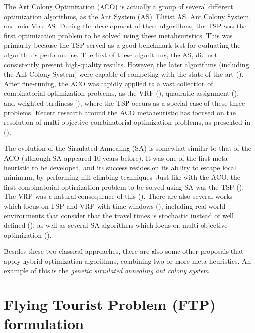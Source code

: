 \documentclass[onecolumn]{elsarticle}
\begin{document}
The Ant Colony Optimization (ACO) is actually a group of several different optimization algorithms, as the Ant System (AS), Elitist AS, Ant Colony System, and min-Max AS. During the development of these algorithms, the TSP was the first optimization problem to be solved using these metaheuristics. This was primarily because the TSP served as a good benchmark test for evaluating the algorithm's performance. The first of these algorithms, the AS, did not consistently present high-quality results. However, the later algorithms (including the Ant Colony System) were capable of competing with the state-of-the-art (\cite{aco_tsp}). After fine-tuning, the ACO was rapidly applied to a vast collection of combinatorial optimization problems, as the VRP (\cite{aco_vrp}), quadratic assignment (\cite{aco_qa}), and weighted tardiness (\cite{aco_wt}), where the TSP occurs as a special case of these three problems. Recent research around the ACO metaheuristic has focused on the resolution of multi-objective combinatorial optimization problems, as presented in (\cite{aco_mo_1,aco_mo_2}).  

The evolution of the Simulated Annealing (SA) is somewhat similar to that of the ACO (although SA appeared 10 years before). It was one of the first meta-heuristic to be developed, and its success resides on its ability to escape local minimum, by performing hill-climbing techniques. Just like with the ACO, the first combinatorial optimization problem to be solved using SA was the TSP (\cite{sa_tsp}). The VRP was a natural consequence of this (\cite{sa_vrp}). There are also several works which focus on TSP and VRP with time-windows (\cite{sa_tsptw,sa_vrptw}), including real-world environments that consider that the travel times is stochastic instead of well defined (\citet{vrp_exact}), as well as several SA algorithms which focus on multi-objective optimization (\cite{sa_mo}).

Besides these two classical approaches, there are also some other proposals that apply hybrid optimization algorithms, combining two or more meta-heuristics.
An example of this is the \textit{genetic simulated annealing ant colony system} \citet{expert_mistura_de_heuristicas}.


\section{Flying Tourist Problem (FTP) formulation}
\label{sec:problem}
\end{document}
